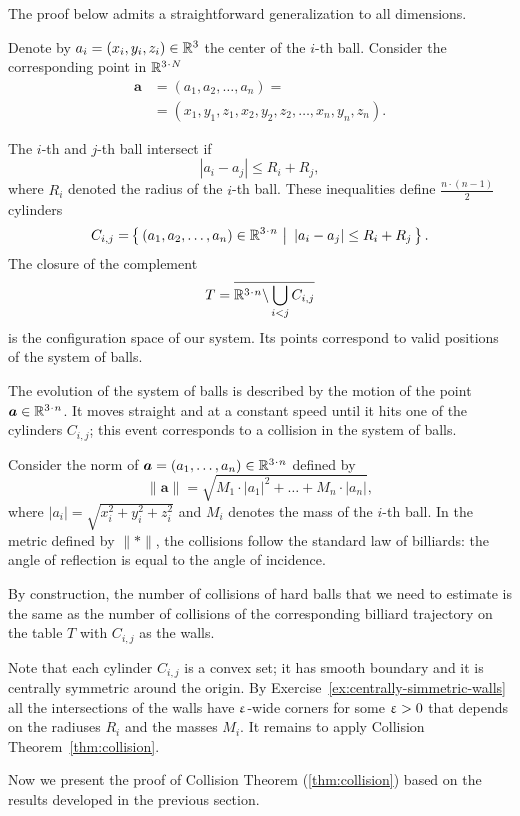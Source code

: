 The proof below admits a straightforward generalization to all dimensions.

Denote by $a_i=(x_i,y_i,z_i) \in \RR^3$ the center of the $i$-th ball.
Consider the corresponding point in $\RR^{3\cdot N}$
\begin{align*}
\bm{a}&=(a_1, a_2 , \dots , a_n ) =
\\
&=(x_1, y_1 , z_1 , x_2 , y_2 , z_2 , \dots , x_n , y_n , z_n).
\end{align*}

The $i$-th and $j$-th ball intersect if 
$$|a_i - a_j | \le R_i+R_j,$$
where $R_i$ denoted the radius of the $i$-th ball.
These inequalities define $\tfrac{n\cdot(n-1)}{2}$ cylinders 
\[C_{i,j}=\set{(a_1, a_2 , \dots , a_n )\in\RR^{3\cdot n}} {|a_i - a_j | \le R_i+R_j}.\] 
The closure of the complement
\[T=\overline{\RR^{3\cdot n}\backslash \bigcup_{i< j} C_{i,j}}\] 
is the configuration space of our system. 
Its points correspond
to valid positions of the system of balls.

The evolution of the system
of balls is described by the motion of
the point $\bm{a}\in\RR^{3\cdot n}$.
It moves straight and at a
constant speed until it hits one of the cylinders $C_{i,j}$; 
this event corresponds
to a collision in the system of balls.

Consider the norm of $\bm{a}=(a_1,\dots,a_n)\in \RR^{3\cdot n}$ defined by
\[\lVert \bm{a}\rVert=\sqrt{M_1\cdot|a_1|^2+\dots+M_n\cdot |a_n|},\]
where $|a_i|=\sqrt{x_i^2+y_i^2+z_i^2}$ 
and $M_i$ denotes the mass of the $i$-th ball.
In the metric defined by $\lVert {*}\rVert$,
the collisions follow the
standard law of billiards: 
the angle of reflection is equal to the angle
of incidence. 

By construction, the number of collisions of hard balls that we need to estimate 
is the same as the number of collisions of the corresponding billiard trajectory on the table $T$ with $C_{i,j}$ as the walls.

Note that each cylinder $C_{i,j}$ is a convex set;
it has smooth boundary 
and it is centrally symmetric around the origin.
By Exercise~\ref{ex:centrally-simmetric-walls} all the intersections of the walls have $\upvarepsilon$-wide corners for some $\upvarepsilon>0$ that depends on the radiuses $R_i$ and the masses $M_i$.
It remains to apply Collision Theorem~\ref{thm:collision}.
\qeds

Now we present the proof of Collision Theorem (\ref{thm:collision})
based on the results developed in the previous section.

